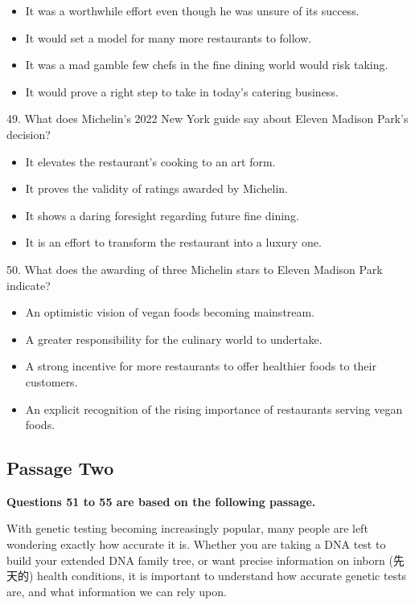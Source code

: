 \documentclass[UTF8,11pt]{ctexart}
\begin{document}
\begin{itemize}[leftmargin=2em,itemsep=.2em,topsep=.4em]\item[A.] It was a worthwhile effort even though he was unsure of its success.
\item[B.] It would set a model for many more restaurants to follow.
\item[C.] It was a mad gamble few chefs in the fine dining world would risk taking.
\item[D.] It would prove a right step to take in today’s catering business.
\end{itemize}

49. What does Michelin’s 2022 New York guide say about Eleven Madison Park’s decision?


\begin{itemize}[leftmargin=2em,itemsep=.2em,topsep=.4em]\item[A.] It elevates the restaurant’s cooking to an art form.
\item[B.] It proves the validity of ratings awarded by Michelin.
\item[C.] It shows a daring foresight regarding future fine dining.
\item[D.] It is an effort to transform the restaurant into a luxury one.
\end{itemize}

50. What does the awarding of three Michelin stars to Eleven Madison Park indicate?


\begin{itemize}[leftmargin=2em,itemsep=.2em,topsep=.4em]\item[A.] An optimistic vision of vegan foods becoming mainstream.
\item[B.] A greater responsibility for the culinary world to undertake.
\item[C.] A strong incentive for more restaurants to offer healthier foods to their customers.
\item[D.] An explicit recognition of the rising importance of restaurants serving vegan foods.
\end{itemize}

\subsection*{\textbf{Passage Two}}


\textbf{Questions 51 to 55 are based on the following passage.}


With genetic testing becoming increasingly popular, many people are left wondering exactly how accurate it is. Whether you are taking a DNA test to build your extended DNA family tree, or want precise information on inborn (先天的) health conditions, it is important to understand how accurate genetic tests are, and what information we can rely upon.
\end{document}
